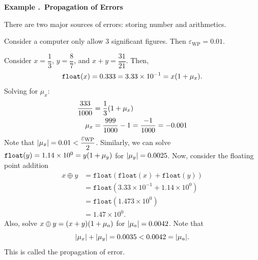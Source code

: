\documentclass[12pt, a4paper]{article}
\newcounter{index}[subsection]
\newenvironment*{eg}[1]{\begin{framed}\par\noindent\textbf{Example \thesubsection.\stepcounter{index}\theindex\ #1} \par}{\par\end{framed}}
\def\float{\texttt{float}}
\def\flt{\texttt{float}}
\def\epsilon{\varepsilon}
\begin{document}
\begin{eg}{Propagation of Errors}
	There are two major sources of errors: storing number and arithmetics. \par Consider a computer only allow $3$ significant figures. Then $\epsilon_\text{WP}=0.01$.\par Consider $x=\dfrac{1}{3}$, $y=\dfrac{8}{7}$, and $x+y=\dfrac{31}{21}$. Then, \[\float(x)=0.333=3.33\times10^{-1}=x\qty(1+\mu_x).\] Solving for $\mu_x$: \[\begin{aligned}\dfrac{333}{1000}&=\dfrac{1}{3}\qty(1+\mu_x)\\\mu_x&=\dfrac{999}{1000}-1=\dfrac{-1}{1000}=-0.001\end{aligned}\] Note that $\qty|\mu_x|=0.01<\dfrac{\epsilon_\text{WP}}{2}$. Similarly, we can solve  $\float(y)=1.14\times10^0=y\qty(1+\mu_y)$ for $\qty|\mu_y|=0.0025$. Now, consider the floating point addition \[\begin{aligned}x\oplus y&=\flt(\flt(x)+\flt(y))\\&=\flt(3.33\times10^{-1}+1.14\times10^0)\\&=\flt(1.473\times10^0)\\&=1.47\times10^0.\end{aligned}\] Also, solve $x\oplus y=(x+y)\qty(1+\mu_a)$ for $\qty|\mu_a|=0.0042$. Note that \[\qty|\mu_x|+\qty|\mu_y|=0.0035<0.0042=\qty|\mu_a|.\] This is called the propagation of error. 
\end{eg}
\end{document}
